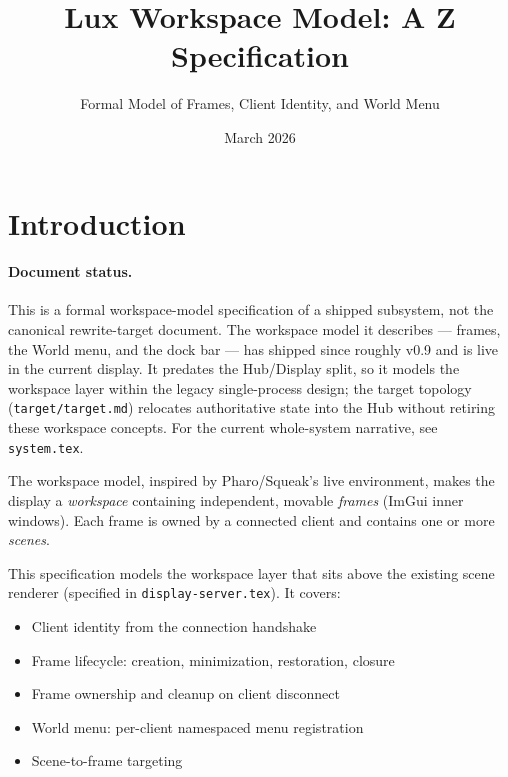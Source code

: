 \documentclass[a4paper,10pt,fleqn]{article}
\begin{document}
\title{Lux Workspace Model: A Z Specification}
\author{Formal Model of Frames, Client Identity, and World Menu}
\date{March 2026}
\maketitle

\tableofcontents
\newpage

\section{Introduction}

\paragraph{Document status.}
This is a formal workspace-model specification of a shipped subsystem, not the
canonical rewrite-target document. The workspace model it describes --- frames,
the World menu, and the dock bar --- has shipped since roughly v0.9 and is live
in the current display. It predates the Hub/Display split, so it models the
workspace layer within the legacy single-process design; the target topology
(\texttt{target/target.md}) relocates authoritative state into the Hub without
retiring these workspace concepts. For the current whole-system narrative, see
\texttt{system.tex}.

The workspace model, inspired by Pharo/Squeak's live environment, makes
the display a \emph{workspace} containing independent, movable
\emph{frames} (ImGui inner windows).  Each frame is owned by a connected
client and contains one or more \emph{scenes}.

This specification models the workspace layer that sits above the
existing scene renderer (specified in \texttt{display-server.tex}).
It covers:
\begin{itemize}
  \item Client identity from the connection handshake
  \item Frame lifecycle: creation, minimization, restoration, closure
  \item Frame ownership and cleanup on client disconnect
  \item World menu: per-client namespaced menu registration
  \item Scene-to-frame targeting
\end{itemize}
\end{document}

